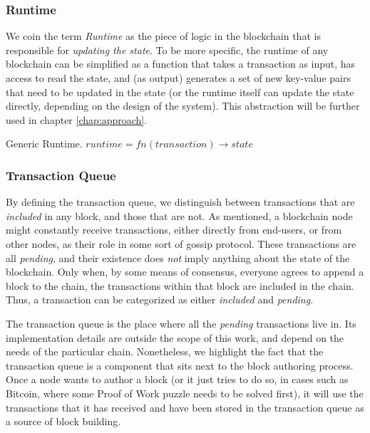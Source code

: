 \subsubsection{Runtime} \label{chap_bg:subsec:runtime}


We coin the term \textit{Runtime} as the piece of logic in the blockchain that is responsible
for \textit{updating the state}. To be more specific, the runtime of any blockchain can be
simplified as a function that takes a transaction as input, has access to read the state, and (as
output) generates a set of new key-value pairs that need to be updated in the state (or the runtime
itself can update the state directly, depending on the design of the system). This abstraction will
be further used in chapter \ref{chap:approach}.

\begin{definition} Generic Runtime.
	$runtime = fn(transaction) \rightarrow state$
\end{definition}

\subsubsection{Transaction Queue} \label{chap_bg:subsec:tx_queue}

By defining the transaction queue, we distinguish between transactions that are \textit{included} in
any block, and those that are not. As mentioned, a blockchain node might constantly receive
transactions, either directly from end-users, or from other nodes, as their role in some sort of
gossip protocol. These transactions are all \textit{pending}, and their existence does \textit{not}
imply anything about the state of the blockchain. Only when, by some means of consensus, everyone
agrees to append a block to the chain, the transactions within that block are included in the chain.
Thus, a transaction can be categorized as either \textit{included} and \textit{pending}.

The transaction queue is the place where all the \textit{pending} transactions live in. Its
implementation details are outside the scope of this work, and depend on the needs of the particular
chain. Nonetheless, we highlight the fact that the transaction queue is a component that sits next
to the block authoring process. Once a node wants to author a block (or it just tries to do so, in
cases such as Bitcoin, where some Proof of Work puzzle needs to be solved first), it will use the
transactions that it has received and have been stored in the transaction queue as a source of block
building.


